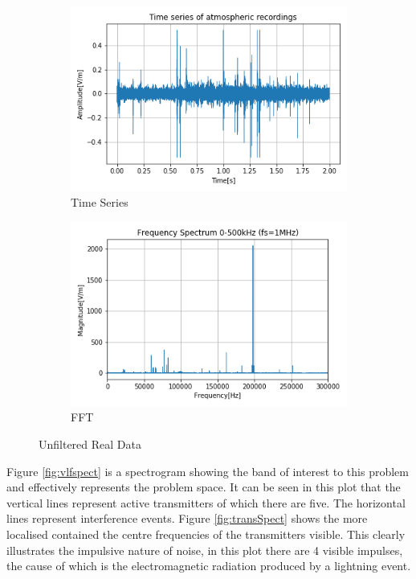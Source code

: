 \begin{figure}[h!]
    \begin{subfigure}[b]{0.5\textwidth}
        \centering
        \includegraphics[width = \textwidth]{figs/sig_character/timeseries.png}
        \caption{Time Series}
        \label{fig:realData}
    \end{subfigure}
    \begin{subfigure}[b]{0.5\textwidth}
        \centering
        \includegraphics[width = \textwidth]{figs/sig_character/fft_data.png}
        \caption{FFT}
        \label{fig:realFFT}
    \end{subfigure}
    \caption{Unfiltered Real Data}
\end{figure}


Figure \ref{fig:vlfspect} is a spectrogram showing the band of interest to this problem and effectively represents the problem space. It can be seen in this plot that the vertical lines represent active transmitters of which there are five. The horizontal lines represent interference events. Figure \ref{fig:transSpect} shows the more localised contained the centre frequencies of the transmitters visible. This clearly illustrates the impulsive nature of noise, in this plot there are 4 visible impulses, the cause of which is the electromagnetic radiation produced by a lightning event. 

